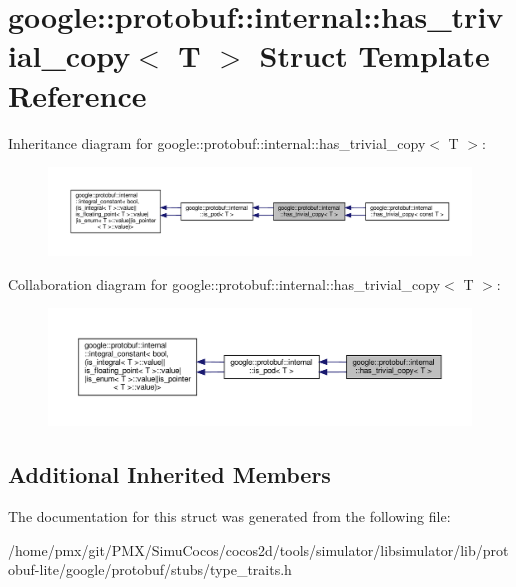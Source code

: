 \hypertarget{structgoogle_1_1protobuf_1_1internal_1_1has__trivial__copy}{}\section{google\+:\+:protobuf\+:\+:internal\+:\+:has\+\_\+trivial\+\_\+copy$<$ T $>$ Struct Template Reference}
\label{structgoogle_1_1protobuf_1_1internal_1_1has__trivial__copy}


Inheritance diagram for google\+:\+:protobuf\+:\+:internal\+:\+:has\+\_\+trivial\+\_\+copy$<$ T $>$\+:
\nopagebreak
\begin{figure}[H]
\begin{center}
\leavevmode
\includegraphics[width=350pt]{structgoogle_1_1protobuf_1_1internal_1_1has__trivial__copy__inherit__graph}
\end{center}
\end{figure}


Collaboration diagram for google\+:\+:protobuf\+:\+:internal\+:\+:has\+\_\+trivial\+\_\+copy$<$ T $>$\+:
\nopagebreak
\begin{figure}[H]
\begin{center}
\leavevmode
\includegraphics[width=350pt]{structgoogle_1_1protobuf_1_1internal_1_1has__trivial__copy__coll__graph}
\end{center}
\end{figure}
\subsection*{Additional Inherited Members}


The documentation for this struct was generated from the following file\+:\begin{DoxyCompactItemize}
\item 
/home/pmx/git/\+P\+M\+X/\+Simu\+Cocos/cocos2d/tools/simulator/libsimulator/lib/protobuf-\/lite/google/protobuf/stubs/type\+\_\+traits.\+h\end{DoxyCompactItemize}
